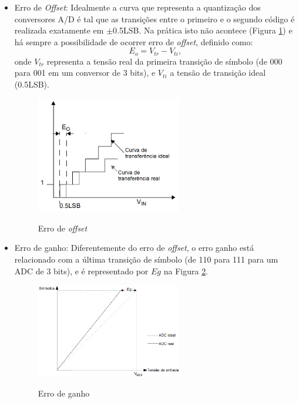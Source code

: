 \documentclass[oneside,openright,12pt]{ufsm_2015} %
\begin{document}
\begin{itemize}
    \item Erro de \textit{Offset}:
    Idealmente a curva que representa a quantização dos conversores A/D é tal que as transições entre o primeiro e o segundo código é realizada exatamente em $\pm$0.5LSB. Na prática isto não acontece (Figura \ref{fig:offset-adc}) e há sempre a possibilidade de ocorrer erro de \textit{offset}, definido como:
    \begin{equation}
        E_o = V_{tr} - V_{ti},
    \end{equation}
    onde $V_{tr}$ representa a tensão real da primeira transição de símbolo (de 000 para 001 em um conversor de 3 bits), e $V_{ti}$ a tensão de transição ideal (0.5LSB).  
    
    \begin{figure}[ht]
    \caption{\label{exepretex} Erro de \textit{offset}}
    \centering
    \includegraphics[width=0.6\textwidth]{figuras/erro_offset.png}
    \vspace{\baselineskip} %
        \label{fig:offset-adc}
    \end{figure}
    
    \item Erro de ganho:
    Diferentemente do erro de \textit{offset}, o erro ganho está relacionado com a última transição de símbolo (de 110 para 111 para um ADC de 3 bits), e é representado por $Eg$ na Figura \ref{fig:eg-adc}.
    
    \begin{figure}[ht]
    \caption{\label{exepretex} Erro de ganho}
    \centering
    \includegraphics[width=0.6\textwidth]{figuras/erro_ganho.png}
    \vspace{\baselineskip} %
        \label{fig:eg-adc}
    \end{figure}
    

\end{itemize}
\end{document}
